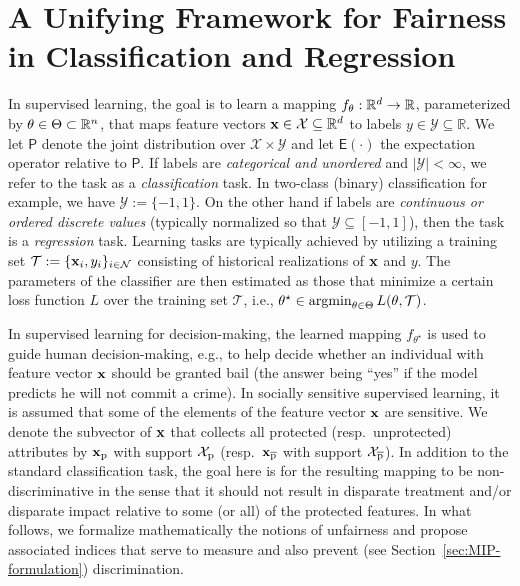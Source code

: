 \documentclass[letterpaper]{article} %
\theoremstyle{definition}
\newcommand{\1}{\ensuremath{{\rm e}}} %
\newcommand{\PR}{\ensuremath{\mathsf{P}}} %
\newcommand{\E}{\ensuremath{\mathsf{E}}} %
\newcommand{\uprx}{{\bf x}_{\overline{\rm p}}}
\newcommand{\prx}{{\bf x}_{\rm p}}
\newcommand{\prX}{{\mathcal X}_{\rm p}}
\newcommand{\uprX}{{\mathcal X}_{\overline{\rm p}}}
\DeclareMathOperator*{\argmin}{\mathrm{argmin}}
\begin{document}
\section{A Unifying Framework for Fairness in Classification and Regression}
\label{sec:fairness}

In supervised learning, the goal is to learn a mapping $f_{\bf \theta}:\mathbb R^d \rightarrow \mathbb R$, parameterized by ${\bf \theta} \in \Theta \subset \mathbb R^n$, that maps feature vectors ${\bf x} \in \mathcal X \subseteq \mathbb R^d$ to labels $y \in \mathcal Y \subseteq \mathbb R$. We let $\PR$ denote the joint distribution over $\mathcal X \times \mathcal Y$ and let $\E(\cdot)$ the expectation operator relative to $\PR$. If labels are \emph{categorical and unordered} and $|\mathcal Y| < \infty $, we refer to the task as a \emph{classification} task. In two-class (binary) classification for example, we have $\mathcal Y:=\{-1,1\}$. On the other hand if labels are \emph{continuous or ordered discrete values} (typically normalized so that $\mathcal Y \subseteq [-1,1]$), then the task is a \emph{regression} task. \color{black} Learning tasks are typically achieved by utilizing a training set $\mathcal T:=\{ {\bf x}_i, y_i \}_{i\in \mathcal N}$ consisting of historical realizations of ${\bf x}$ and $y$. The parameters of the classifier are then estimated as those that minimize a certain loss function $L$ over the training set $\mathcal T$, i.e., $\theta^\star \in \argmin_{\theta \in \Theta} L({\bf \theta},\mathcal T)$.

In supervised learning for decision-making, the learned mapping $f_{\theta^\star}$ is used to guide human decision-making, e.g., to help decide whether an individual with feature vector ${\bf x}$ should be granted bail (the answer being ``yes'' if the model predicts he will not commit a crime). In socially sensitive supervised learning, it is assumed that some of the elements of the feature vector ${\bf x}$ are sensitive. We denote the subvector of ${\bf x}$ that collects all protected (resp.\ unprotected) attributes by $\prx$ with support $\prX$ (resp.\ $\uprx$ with support $\uprX$). In addition to the standard classification task, the goal here is for the resulting mapping to be non-discriminative in the sense that it should not result in disparate treatment and/or disparate impact relative to some (or all) of the protected features. In what follows, we formalize mathematically the notions of unfairness and propose associated indices that serve to measure and also prevent (see Section~\ref{sec:MIP-formulation}) discrimination.
\end{document}

